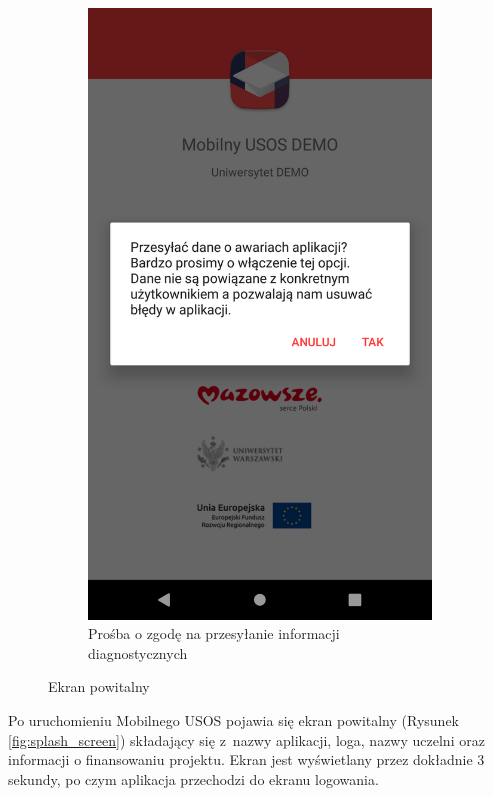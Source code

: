 \documentclass{pracamgr}
\begin{document}
\begin{figure}[p]
\begin{subfigure}[t]{0.3\textwidth}
		\includegraphics[width=\textwidth]{img/splash_prompt.png}
		\caption{Prośba o zgodę na przesyłanie informacji diagnostycznych}
		\label{fig:splash_prompt}
	\end{subfigure}
	
	\caption{Ekran powitalny}\label{fig:splash}
	\medskip
\end{figure}

Po uruchomieniu Mobilnego USOS pojawia się ekran powitalny (Rysunek \ref{fig:splash_screen}) składający się z~nazwy
aplikacji, loga, nazwy uczelni oraz informacji o finansowaniu projektu.
Ekran jest wyświetlany przez dokładnie 3 sekundy, po czym aplikacja przechodzi do
ekranu logowania.
\end{document}
